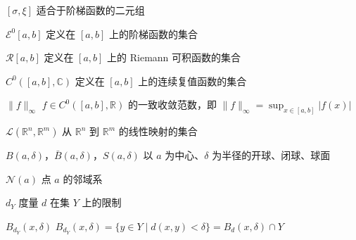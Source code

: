 \([\sigma,\xi]\) 适合于阶梯函数的二元组 

\(\mathscr{E}^{0}[a,b]\) 定义在 \([a,b]\) 上的阶梯函数的集合 

\(\mathscr{R}[a,b]\) 定义在 \([a,b]\) 上的 Riemann 可积函数的集合 

\(C^0([a,b],\mathbb{C})\) 定义在 \([a,b]\) 上的连续复值函数的集合 

\(\|f\|_{\infty}\) \(f\in C^0([a,b],\mathbb{R})\) 的一致收敛范数，即 \(\|f\|_{\infty}=\sup_{x\in[a,b]}|f(x)|\) 

\(\mathscr{L}(\mathbb{R}^n,\mathbb{R}^m)\) 从 \(\mathbb{R}^n\) 到 \(\mathbb{R}^m\) 的线性映射的集合 

\(B(a,\delta)\)，\(\bar{B}(a,\delta)\)，\(S(a,\delta)\) 以 \(a\) 为中心、\(\delta\) 为半径的开球、闭球、球面 

\(\mathscr{N}(a)\) 点 \(a\) 的邻域系 

\(d_Y\) 度量 \(d\) 在集 \(Y\) 上的限制 

\(B_{d_Y}(x,\delta)\) \(B_{d_Y}(x,\delta)=\{y\in Y\mid d(x,y)<\delta\}=B_d(x,\delta)\cap Y\) 
